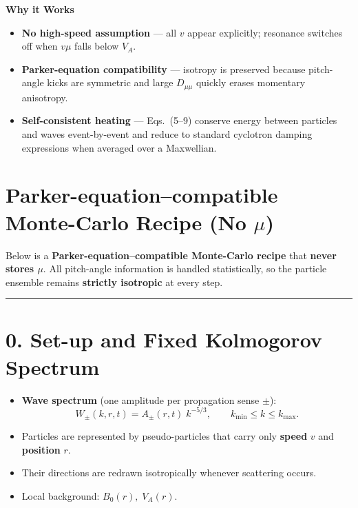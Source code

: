 \begin{tcolorbox}[colframe=black, colback=white, title=Self-Contained Monte-Carlo Recipe for Solar-Wind Ions]
\bigskip

\textbf{Why it Works}
\begin{itemize}
    \item \textbf{No high-speed assumption} — all \( v \) appear explicitly; resonance switches off when \( v \mu \) falls below \( V_A \).
    \item \textbf{Parker-equation compatibility} — isotropy is preserved because pitch-angle kicks are symmetric and large \( D_{\mu\mu} \) quickly erases momentary anisotropy.
    \item \textbf{Self-consistent heating} — Eqs.~(5–9) conserve energy between particles and waves event-by-event and reduce to standard cyclotron damping expressions when averaged over a Maxwellian.
\end{itemize}

\end{tcolorbox}


\section*{Parker-equation–compatible Monte-Carlo Recipe (No \(\mu\))}

Below is a \textbf{Parker-equation–compatible Monte-Carlo recipe} that \textbf{never stores \( \mu \)}.
All pitch-angle information is handled statistically, so the particle ensemble remains \textbf{strictly isotropic} at every step.

\bigskip
\hrule
\bigskip

\section*{0. Set-up and Fixed Kolmogorov Spectrum}

\begin{itemize}
    \item \textbf{Wave spectrum} (one amplitude per propagation sense \( \pm \)):
    \[
    W_\pm(k, r, t) = A_\pm(r, t)\; k^{-5/3}, \qquad k_{\min} \leq k \leq k_{\max}.
    \]
    
    \item Particles are represented by pseudo-particles that carry only \textbf{speed} \( v \) and \textbf{position} \( r \).
    
    \item Their directions are redrawn isotropically whenever scattering occurs.
    
    \item Local background: \( B_0(r), \; V_A(r) \).
\end{itemize}

